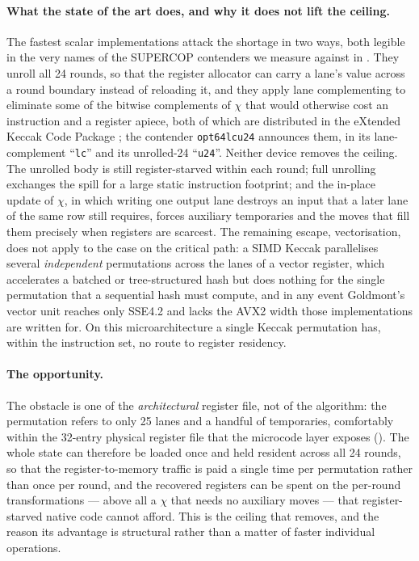 \paragraph{What the state of the art does, and why it does not lift the ceiling.}
The fastest scalar implementations attack the shortage in two ways, both legible
in the very names of the SUPERCOP contenders we measure against in
. They unroll all 24 rounds, so that the register allocator
can carry a lane's value across a round boundary instead of reloading it, and they
apply lane complementing to eliminate some of the bitwise complements of $\chi$
that would otherwise cost an instruction and a register apiece, both of which are
distributed in the eXtended Keccak Code Package \cite{XKCP}; the contender
\texttt{opt64lcu24} announces them, in its lane-complement ``\texttt{lc}'' and its
unrolled-24 ``\texttt{u24}''. Neither device removes the ceiling. The unrolled
body is still register-starved within each round; full unrolling exchanges the
spill for a large static instruction footprint; and the in-place update of
$\chi$, in which writing one output lane destroys an input that a later lane of
the same row still requires, forces auxiliary temporaries and the moves that fill
them precisely when registers are scarcest. The remaining escape, vectorisation,
does not apply to the case on the critical path: a SIMD Keccak parallelises
several \emph{independent} permutations across the lanes of a vector register,
which accelerates a batched or tree-structured hash but does nothing for the
single permutation that a sequential hash must compute, and in any event
Goldmont's vector unit reaches only SSE4.2 and lacks the AVX2 width those
implementations are written for. On this microarchitecture a single Keccak
permutation has, within the instruction set, no route to register residency.

\paragraph{The opportunity.}
The obstacle is one of the \emph{architectural} register file, not of the
algorithm: the permutation refers to only 25 lanes and a handful of temporaries,
comfortably within the 32-entry physical register file that the microcode layer
exposes (). The whole state can therefore be loaded once
and held resident across all 24 rounds, so that the register-to-memory traffic is
paid a single time per permutation rather than once per round, and the recovered
registers can be spent on the per-round transformations --- above all a $\chi$
that needs no auxiliary moves --- that register-starved native code cannot afford.
This is the ceiling that  removes, and the reason its advantage
is structural rather than a matter of faster individual operations.

